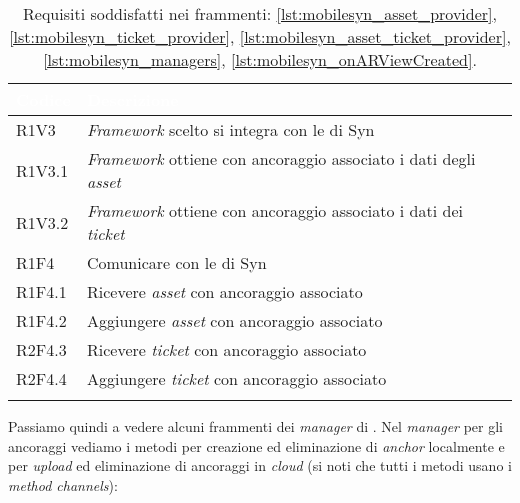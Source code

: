 {
    \setlength{\freewidth}{\dimexpr\textwidth-10\tabcolsep}
    \renewcommand{\arraystretch}{1.5}
    \centering
    \setlength{\aboverulesep}{0pt}
    \setlength{\belowrulesep}{0pt}
    \begin{longtable}{C{.15\freewidth} C{.965\freewidth}}
       \toprule
    \textcolor{white}{\textbf{Codice}}&
    \textcolor{white}{\textbf{Descrizione}}\\
    \toprule
    \endhead

    R1V3 & \textit{Framework} scelto si integra con le \api{} di Syn\\
    R1V3.1 & \textit{Framework} ottiene con ancoraggio associato i dati degli \textit{asset}\\
    R1V3.2 & \textit{Framework} ottiene con ancoraggio associato i dati dei \textit{ticket}\\ 
    R1F4 & Comunicare con le \api{} di Syn\\
    R1F4.1 & Ricevere \textit{asset} con ancoraggio associato\\
    R1F4.2 & Aggiungere \textit{asset} con ancoraggio associato\\
    R2F4.3 & Ricevere \textit{ticket} con ancoraggio associato\\
    R2F4.4 & Aggiungere \textit{ticket} con ancoraggio associato\\
  
    \bottomrule
    \caption{Requisiti soddisfatti nei frammenti: \ref{lst:mobilesyn_asset_provider}, \ref{lst:mobilesyn_ticket_provider}, \ref{lst:mobilesyn_asset_ticket_provider}, \ref{lst:mobilesyn_managers}, \ref{lst:mobilesyn_onARViewCreated}.}
    \end{longtable}
}

Passiamo quindi a vedere alcuni frammenti dei \textit{manager} di \aplug{}.
Nel \textit{manager} per gli ancoraggi vediamo i metodi per creazione ed eliminazione di \textit{anchor} localmente e per \textit{upload} ed eliminazione di ancoraggi in \textit{cloud} (si noti che tutti i metodi usano i \textit{method channels}): 

